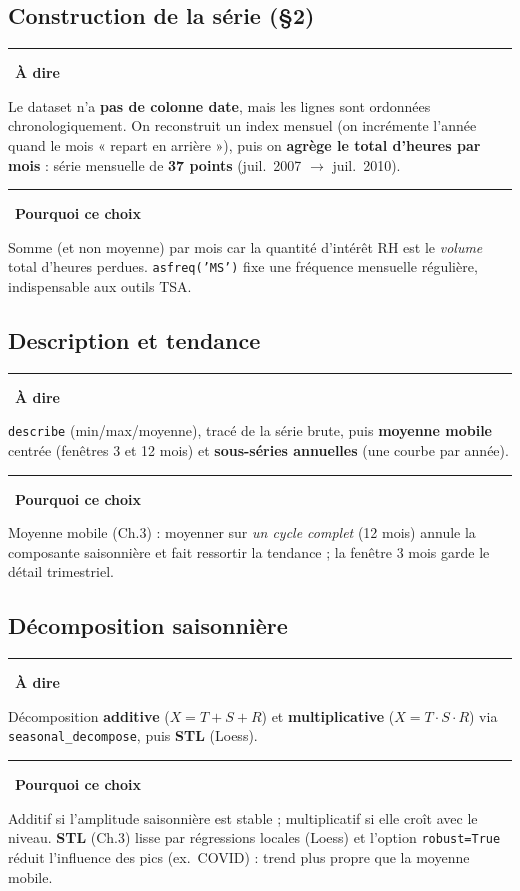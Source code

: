 \documentclass[11pt,a4paper]{article}
\newcommand{\code}[1]{\texttt{#1}}
\newenvironment{say}{\par\medskip\noindent\textcolor{blue!45!black}{\rule[-1pt]{3pt}{12pt}}\
  \textbf{\textcolor{blue!45!black}{À dire}}\par\nopagebreak\smallskip\noindent\ignorespaces}{\par\medskip}
\newenvironment{why}{\par\medskip\noindent\textcolor{orange!60!black}{\rule[-1pt]{3pt}{12pt}}\
  \textbf{\textcolor{orange!60!black}{Pourquoi ce choix}}\par\nopagebreak\smallskip\noindent\ignorespaces}{\par\medskip}
\begin{document}
\subsection{Construction de la série (\S2)}
\begin{say}
Le dataset n'a \textbf{pas de colonne date}, mais les lignes sont ordonnées chronologiquement.
On reconstruit un index mensuel (on incrémente l'année quand le mois « repart en arrière »),
puis on \textbf{agrège le total d'heures par mois} : série mensuelle de \textbf{37 points}
(juil.~2007 $\to$ juil.~2010).
\end{say}
\begin{why}
Somme (et non moyenne) par mois car la quantité d'intérêt RH est le \emph{volume} total d'heures
perdues. \code{asfreq('MS')} fixe une fréquence mensuelle régulière, indispensable aux outils TSA.
\end{why}

\subsection{Description et tendance}
\begin{say}
\code{describe} (min/max/moyenne), tracé de la série brute, puis \textbf{moyenne mobile} centrée
(fenêtres 3 et 12 mois) et \textbf{sous-séries annuelles} (une courbe par année).
\end{say}
\begin{why}
Moyenne mobile (Ch.3) : moyenner sur \emph{un cycle complet} (12 mois) annule la composante
saisonnière et fait ressortir la tendance ; la fenêtre 3 mois garde le détail trimestriel.
\end{why}

\subsection{Décomposition saisonnière}
\begin{say}
Décomposition \textbf{additive} ($X=T+S+R$) et \textbf{multiplicative} ($X=T\cdot S\cdot R$) via
\code{seasonal\_decompose}, puis \textbf{STL} (Loess).
\end{say}
\begin{why}
Additif si l'amplitude saisonnière est stable ; multiplicatif si elle croît avec le niveau.
\textbf{STL} (Ch.3) lisse par régressions locales (Loess) et l'option \code{robust=True} réduit
l'influence des pics (ex.\ COVID) : trend plus propre que la moyenne mobile.
\end{why}
\end{document}
